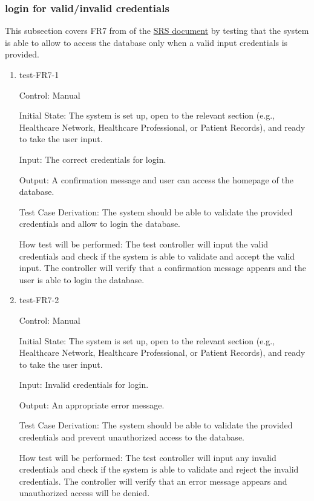 \documentclass[12pt, titlepage]{article}
\begin{document}
\subsubsection{login for valid/invalid credentials} \label{section:4.1.4}

This subsection covers FR7 from of the \href{https://github.com/Inreet-Kaur/capstone/blob/main/docs/SRS/SRS.pdf}{SRS document} \citep{SRS} by testing that the system is able to allow to access the database only when a valid input credentials is provided.

\begin{enumerate}

\item{test-FR7-1} \label{test-FR7-1}

Control: Manual

Initial State: The system is set up, open to the relevant section (e.g., Healthcare Network, Healthcare Professional, or Patient Records), and ready to take the user input.

Input: The correct credentials for login.

Output: A confirmation message and user can access the homepage of the database.

Test Case Derivation: The system should be able to validate the provided credentials and allow to login the database.

How test will be performed: The test controller will input the valid credentials and check if the system is able to validate and accept the valid input. The controller will verify that a confirmation message appears and the user is able to login the database.


\item{test-FR7-2} \label{test-FR7-2}

Control: Manual

Initial State: The system is set up, open to the relevant section (e.g., Healthcare Network, Healthcare Professional, or Patient Records), and ready to take the user input.

Input: Invalid credentials for login.

Output: An appropriate error message.

Test Case Derivation: The system should be able to validate the provided credentials and prevent unauthorized access to the database.

How test will be performed: The test controller will input any invalid credentials and check if the system is able to validate and reject the invalid credentials. The controller will verify that an error message appears and unauthorized access will be denied.

\end{enumerate}
\end{document}
